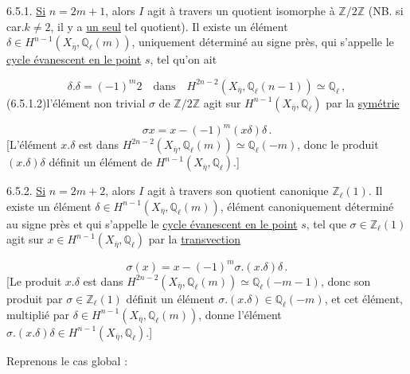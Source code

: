 6.5.1. \underline{Si} $n = 2m+1$, alors $I$ agit à travers un quotient isomorphe à $\mathbb{Z}/2\mathbb{Z}$ (NB. si car.$k \neq 2$, il y a \underline{un seul} tel quotient). Il existe un élément $\delta \in H^{n-1}(X_{\overline{\eta}},\mathbb{Q}_\ell(m))$, uniquement déterminé au signe près, qui s'appelle le \underline{cycle évanescent en le point} $s$, tel qu'on ait 



\begin{equation}\tag{6.5.1.1}
 \delta.\delta = (-1)^m 2 \quad \text{dans} \quad H^{2n-2}(X_{\overline{\eta}},\mathbb{Q}_\ell(n-1)) \simeq \mathbb{Q}_\ell \, ,
\end{equation}
(6.5.1.2)\quad l'élément non trivial $\sigma$ de $\mathbb{Z}/2\mathbb{Z}$ agit sur $H^{n-1}(X_{\overline{\eta}},\mathbb{Q}_\ell)$ par la \underline{symétrie}

\begin{equation*}
\sigma x = x - (-1)^m (x\delta)\delta \, .
\end{equation*}
[L'élément $x.\delta$ est dans $H^{2n-2}(X_{\overline{\eta}},\mathbb{Q}_\ell(m)) \simeq \mathbb{Q}_\ell(-m)$, donc le produit $(x.\delta)\delta$ définit un élément de $H^{n-1}(X_{\overline{\eta}},\mathbb{Q}_\ell)$.]

6.5.2. \underline{Si} $n = 2m + 2$, alors $I$ agit à travers son quotient canonique $\mathbb{Z}_\ell(1)$. Il existe un élément $\delta \in H^{n-1}(X_{\overline{\eta}},\mathbb{Q}_\ell(m))$, élément canoniquement déterminé au signe près et qui s'appelle le \underline{cycle évanescent en le point} $s$, tel que $\sigma \in \mathbb{Z}_\ell(1)$ agit sur $x \in H^{n-1}(X_{\overline{\eta}},\mathbb{Q}_\ell)$ par la \underline{transvection}

\begin{equation}\tag{6.5.2.1}
\sigma(x) = x - (-1)^m \sigma.(x.\delta)\delta \, .
\end{equation}
[Le produit $x.\delta$ est dans $H^{2n-2}(X_{\overline{\eta}},\mathbb{Q}_\ell(m)) \simeq \mathbb{Q}_\ell(-m-1)$, donc son produit par $\sigma \in \mathbb{Z}_\ell(1)$ définit un élément $\sigma.(x.\delta) \in \mathbb{Q}_\ell(-m)$, et cet élément, multiplié par $\delta \in H^{n-1}(X_{\overline{\eta}},\mathbb{Q}_\ell(m))$, donne l'élément $\sigma.(x.\delta)\delta \in H^{n-1}(X_{\overline{\eta}},\mathbb{Q}_\ell)$.]

Reprenons le cas global :

